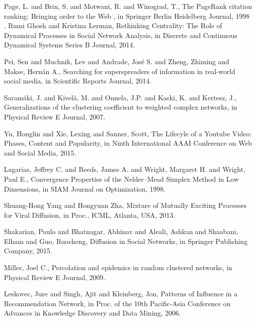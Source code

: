 \documentclass[smallextended]{svjour3}       %
\theoremstyle{definition}
\begin{document}
\begin{thebibliography}{}
{Page, L. and Brin, S. and Motwani, R. and Winograd, T.},
The PageRank citation ranking: Bringing order to the Web	,
in Springer Berlin Heidelberg Journal,
{1998
	.}
{Rumi Ghosh and Kristina Lerman},
Rethinking Centrality: The Role of Dynamical Processes in Social Network Analysis,
in Discrete and Continuous Dynamical Systems Series B Journal,
{2014.}

{Pei, Sen and Muchnik, Lev and Andrade, Jos\'{e} S. and Zheng, Zhiming and Makse, Hern\'{a}n A.},
Searching for superspreaders of information in real-world social media,
in Scientific Reports Journal,
{2014.}

{Saram{\"a}ki, J. and Kivel{\"a}, M. and Onnela, J.P. and Kaski, K. and Kertesz, J.},
Generalizations of the clustering coefficient to weighted complex networks,
in Physical Review E Journal,
{2007.}

{Yu, Honglin and Xie, Lexing and Sanner, Scott},
The Lifecyle of a Youtube Video: Phases, Content and Popularity,
in Ninth International AAAI Conference on Web and Social Media,
{2015.}

{Lagarias, Jeffrey C. and Reeds, James A. and Wright, Margaret H. and Wright, Paul E.},
Convergence Properties of the  Nelder--Mead Simplex Method in Low Dimensions,
in SIAM Journal on Optimization,
{1998.}

{Shuang{-}Hong Yang and
	Hongyuan Zha},
Mixture of Mutually Exciting Processes for Viral Diffusion,
in Proc.,
{ICML}, Atlanta, USA,
{2013.}

{Shakarian, Paulo and Bhatnagar, Abhinav and Aleali, Ashkan and Shaabani, Elham and Guo, Ruocheng},
Diffusion in Social Networks,
in Springer Publishing Company,
{2015.}

{Miller, Joel C.},
Percolation and epidemics in random clustered networks,
in Physical Review E Journal,
{2009.}

{Leskovec, Jure and Singh, Ajit and Kleinberg, Jon},
Patterns of Influence in a Recommendation Network,
in Proc. of the 10th Pacific-Asia Conference on Advances in Knowledge Discovery and Data Mining,
{2006.}


\end{thebibliography}
\end{document}
